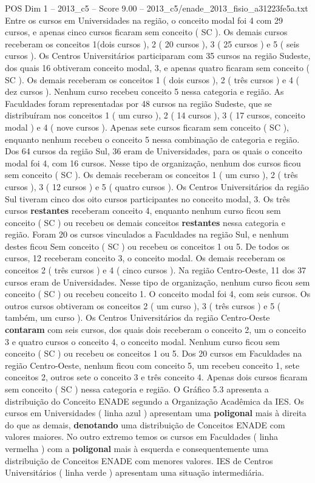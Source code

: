 \begin{textsample}{POS Dim 1 – 2013\_c5 – Score 9.00 – 2013\_c5/enade\_2013\_fisio\_a31223fe5a.txt}
Entre os cursos em Universidades na região, o conceito modal foi 4 com 29 cursos, e apenas cinco cursos ficaram sem conceito ( SC ).
Os demais cursos receberam os conceitos 1(dois cursos ), 2 ( 20 cursos ), 3 ( 25 cursos ) e 5 ( seis cursos ).
Os Centros Universitários participaram com 35 cursos na região Sudeste, dos quais 16 obtiveram conceito modal, 3, e apenas quatro ficaram sem conceito ( SC ).
Os demais receberam os conceitos 1 ( dois cursos ), 2 ( três cursos ) e 4 ( dez cursos ).
Nenhum curso recebeu conceito 5 nessa categoria e região.
As Faculdades foram representadas por 48 cursos na região Sudeste, que se distribuíram nos conceitos 1 ( um curso ), 2 ( 14 cursos ), 3 ( 17 cursos, conceito modal ) e 4 ( nove cursos ).
Apenas sete cursos ficaram sem conceito ( SC ), enquanto nenhum recebeu o conceito 5 nessa combinação de categoria e região.
Dos 64 cursos da região Sul, 36 eram de Universidades, para os quais o conceito modal foi 4, com 16 cursos.
Nesse tipo de organização, nenhum dos cursos ficou sem conceito ( SC ).
Os demais receberam os conceitos 1 ( um curso ), 2 ( três cursos ), 3 ( 12 cursos ) e 5 ( quatro cursos ).
Os Centros Universitários da região Sul tiveram cinco dos oito cursos participantes no conceito modal, 3.
Os três cursos \textbf{restantes} receberam conceito 4, enquanto nenhum curso ficou sem conceito ( SC ) ou recebeu os demais conceitos \textbf{restantes} nessa categoria e região.
Foram 20 os cursos vinculados a Faculdades na região Sul, e nenhum destes ficou Sem conceito ( SC ) ou recebeu os conceitos 1 ou 5.
De todos os cursos, 12 receberam conceito 3, o conceito modal.
Os demais receberam os conceitos 2 ( três cursos ) e 4 ( cinco cursos ).
Na região Centro-Oeste, 11 dos 37 cursos eram de Universidades.
Nesse tipo de organização, nenhum curso ficou sem conceito ( SC ) ou recebeu conceito 1.
O conceito modal foi 4, com seis cursos.
Os outros cursos obtiveram os conceitos 2 ( um curso ), 3 ( três cursos ) e 5 ( também, um curso ).
Os Centros Universitários da região Centro-Oeste \textbf{contaram} com seis cursos, dos quais dois receberam o conceito 2, um o conceito 3 e quatro cursos o conceito 4, o conceito modal.
Nenhum curso ficou sem conceito ( SC ) ou recebeu os conceitos 1 ou 5.
Dos 20 cursos em Faculdades na região Centro-Oeste, nenhum ficou com conceito 5, um recebeu conceito 1, sete conceitos 2, outros sete o conceito 3 e três conceito 4.
Apenas dois cursos ficaram sem conceito ( SC ) nessa categoria e região.
O Gráfico 5.3 apresenta a distribuição do Conceito ENADE segundo a Organização Acadêmica da IES.
Os cursos em Universidades ( linha azul ) apresentam uma \textbf{poligonal} mais à direita do que as demais, \textbf{denotando} uma distribuição de Conceitos ENADE com valores maiores.
No outro extremo temos os cursos em Faculdades ( linha vermelha ) com a \textbf{poligonal} mais à esquerda e consequentemente uma distribuição de Conceitos ENADE com menores valores.
IES de Centros Universitários ( linha verde ) apresentam uma situação intermediária.

\end{textsample}
